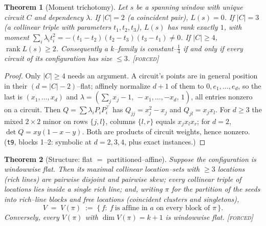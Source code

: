 \documentclass[11pt]{article}
\newtheorem{theorem}{Theorem}[section]
\theoremstyle{definition}
\newcommand{\forcedtag}{{\scshape [forced]}}
\begin{document}
\begin{theorem}[Moment trichotomy]\label{thm:momtri}
Let $s$ be a spanning window with unique circuit $C$ and dependency $\lambda$. If $|C|=2$ (a
coincident pair), $L(s)=0$. If $|C|=3$ (a collinear triple with parameters $t_1,t_2,t_3$),
$L(s)$ has rank exactly $1$, with moment
$\sum_i\lambda_it_i^2=-(t_1-t_2)(t_2-t_3)(t_3-t_1)\ne0$. If $|C|\ge4$,
$\operatorname{rank}L(s)\ge2$. Consequently a $k$--family is constant--$\tfrac14$ if and only if
every circuit of its configuration has size $\le3$. \forcedtag
\end{theorem}

\begin{proof}
Only $|C|\ge4$ needs an argument. A circuit's points are in general position in their
$(d{=}|C|{-}2)$--flat; affinely normalize $d+1$ of them to $0,e_1,\dots,e_d$, so the last is
$(x_1,\dots,x_d)$ and $\lambda=(\sum_jx_j-1,\,-x_1,\dots,-x_d,\,1)$, all entries nonzero on a
circuit. Then $Q=\sum\lambda_iP_iP_i^{\top}$ has $Q_{jj}=x_j^2-x_j$ and $Q_{jl}=x_jx_l$. For
$d\ge3$ the mixed $2\times2$ minor on rows $\{j,l\}$, columns $\{l,r\}$ equals $x_jx_lx_r$; for
$d=2$, $\det Q=xy(1-x-y)$. Both are products of circuit weights, hence nonzero.
(\texttt{t9}, blocks 1--2: symbolic at $d=2,3,4$, plus exact instances.)
\end{proof}

\begin{theorem}[Structure: flat $=$ partitioned--affine]\label{thm:pastruct}
Suppose the configuration is windowwise flat. Then its maximal collinear location--sets with
$\ge3$ locations (\emph{rich lines}) are pairwise disjoint and pairwise skew; every collinear
triple of locations lies inside a single rich line; and, writing $\pi$ for the partition of the
seeds into rich--line blocks and free locations (coincident clusters and singletons),
\[
V\;=\;V(\pi)\;:=\;\{\,f:\ f\ \text{is affine in }a\text{ on every block of }\pi\,\}.
\]
Conversely, every $V(\pi)$ with $\dim V(\pi)=k+1$ is windowwise flat. \forcedtag
\end{theorem}
\end{document}

